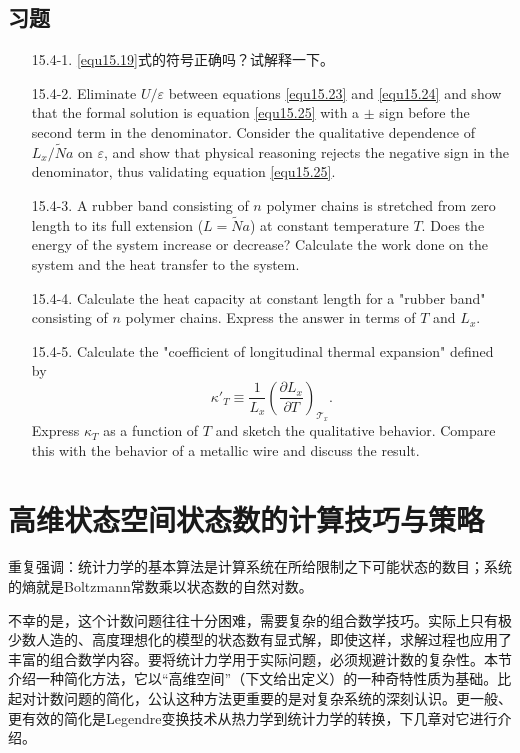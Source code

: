 \subsection*{习题}
\begin{itemize}
	\item[15.4-1.] \eqref{equ15.19}式的符号正确吗？试解释一下。
	\item[15.4-2.] Eliminate $U/\varepsilon$ between equations \eqref{equ15.23} and \eqref{equ15.24} and show that the formal solution is equation \eqref{equ15.25} with a $\pm$ sign before the second term in the denominator. Consider the qualitative dependence of $L_x / \tilde{N}a$ on $\varepsilon$, and show that physical reasoning rejects the negative sign in the denominator, thus validating equation \eqref{equ15.25}.
	\item[15.4-3.] A rubber band consisting of $n$ polymer chains is stretched from zero length to its full extension ($L = \tilde{N}a$) at constant temperature $T$. Does the energy of the system increase or decrease? Calculate the work done on the system and the heat transfer to the system.
	\item[15.4-4.] Calculate the heat capacity at constant length for a "rubber band" consisting of $n$ polymer chains. Express the answer in terms of $T$ and $L_x$.
	\item[15.4-5.]Calculate the "coefficient of longitudinal thermal expansion" defined by
	\[
		\kappa'_T \equiv \frac{1}{L_x} \left( \frac{\partial L_x}{\partial T} \right)_{\mathscr{T}_x}.	
	\]
	Express $\kappa_T$ as a function of $T$ and sketch the qualitative behavior. Compare this with the behavior of a metallic wire and discuss the result.
\end{itemize}

\section{高维状态空间状态数的计算技巧与策略}
\label{sec15.5}
重复强调：统计力学的基本算法是计算系统在所给限制之下可能状态的数目；系统的熵就是Boltzmann常数乘以状态数的自然对数。

不幸的是，这个计数问题往往十分困难，需要复杂的组合数学技巧。实际上只有极少数人造的、高度理想化的模型的状态数有显式解，即使这样，求解过程也应用了丰富的组合数学内容。要将统计力学用于实际问题，必须规避计数的复杂性。本节介绍一种简化方法，它以“高维空间”（下文给出定义）的一种奇特性质为基础。比起对计数问题的简化，公认这种方法更重要的是对复杂系统的深刻认识。更一般、更有效的简化是Legendre变换技术从热力学到统计力学的转换，下几章对它进行介绍。

